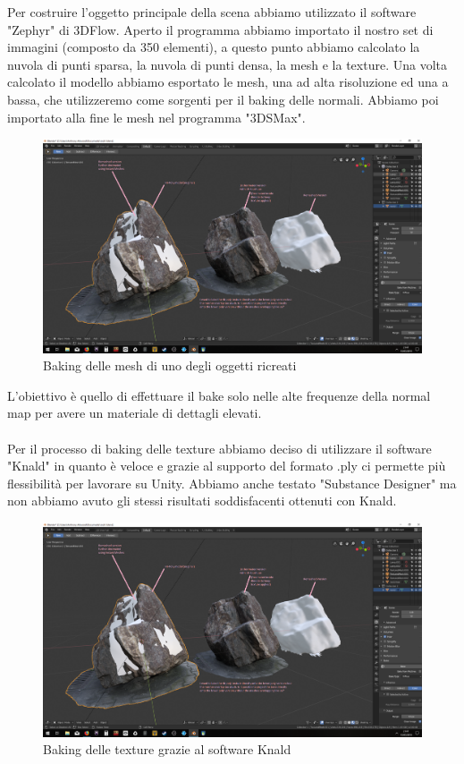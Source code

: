 \documentclass[12pt]{report}
\begin{document}
Per costruire l'oggetto principale della scena abbiamo utilizzato il software "Zephyr" di 3DFlow.
Aperto il programma abbiamo importato il nostro set di immagini (composto da 350 elementi), a questo punto
abbiamo calcolato la nuvola di punti sparsa, la nuvola di punti densa, la mesh e la texture. Una volta calcolato il modello abbiamo esportato le mesh, una ad alta risoluzione ed una a bassa, che utilizzeremo come sorgenti per il baking delle normali. Abbiamo poi importato alla fine le mesh nel programma "3DSMax".
\begin{figure}[H]
    \centering
    \includegraphics[width = \linewidth]{img/3dsmax_1.png}
    \caption{Baking delle mesh di uno degli oggetti ricreati}
\end{figure}

L'obiettivo \`e quello di effettuare il bake solo nelle alte frequenze della normal map per avere un materiale di dettagli elevati. %
\\
\\
Per il processo di baking delle texture abbiamo deciso di utilizzare il software "Knald" in quanto \`e veloce e grazie al supporto del formato .ply ci permette pi\`u flessibilit\`a per lavorare su Unity.
Abbiamo anche testato "Substance Designer" ma non abbiamo avuto gli stessi risultati soddisfacenti ottenuti con Knald.

\begin{figure}[H]
    \centering
    \includegraphics[width = \linewidth]{img/3dsmax_1.png}
    \caption{Baking delle texture grazie al software Knald}
\end{figure}
\end{document}
